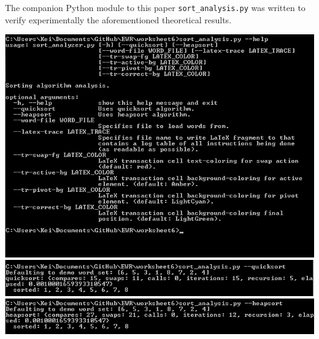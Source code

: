 The companion Python module to this paper \texttt{sort\_analysis.py} was written to verify experimentally the aforementioned theoretical results.

\includegraphics{images/help_command.png}
\includegraphics{images/quicksort_demo.png}
\includegraphics{images/heapsort_demo.png}